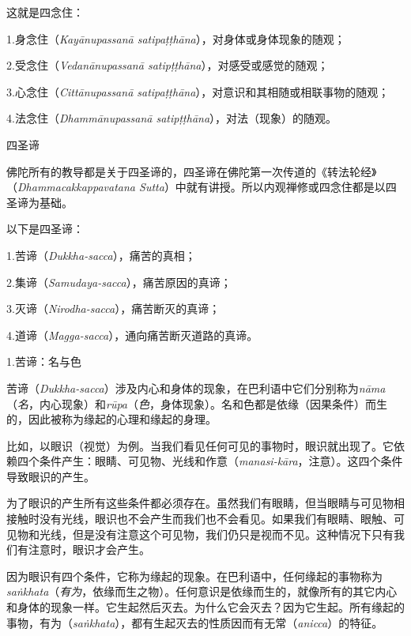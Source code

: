 这就是四念住：

{
\leftskip=1.6pc
\item{1.}身念住（{\it Kay\=anupassan\=a satipa\d t\d th\=ana}），对身体或身体现象的随观；
\item{2.}受念住（{\it Vedan\=anupassan\=a satip\d t\d th\=ana}），对感受或感觉的随观；
\item{3.}心念住（{\it Citt\=anupassan\=a satipa\d t\d th\=ana}），对意识和其相随或相联事物的随观；
\item{4.}\1法念住（{\it Dhamm\=anupassan\=a satip\d t\d th\=ana}），对法（现象）的随观。

}

\ssubsectnon 四圣谛

佛陀所有的教导都是关于四圣谛的，四圣谛在佛陀第一次传道的《转法轮经》（{\it Dhammacakkappavatana Sutta}）中就有讲授。所以内观禅修或四念住都是以四圣谛为基础。

以下是四圣谛：

{
\leftskip=1.6pc
\item{1.}苦谛（{\it Dukkha-sacca}），痛苦的真相；
\item{2.}集谛（{\it Samudaya-sacca}），痛苦原因的真谛；
\item{3.}灭谛（{\it Nirodha-sacca}），痛苦断灭的真谛；
\item{4.}道谛（{\it Magga-sacca}），通向痛苦断灭道路的真谛。

}

\sssubsectnon 1.苦谛：名与色

苦谛（{\it Dukkha-sacca}）涉及内心和身体的现象，在巴利语中它们分别称为{\it n\=ama}（{\it 名}，内心现象）和{\it r\=upa}（{\it 色}，身体现象）。名和色都是依缘（因果条件）而生的，因此被称为缘起的心理和缘起的身理。

比如，以眼识（视觉）为例。当我们看见任何可见的事物时，眼识就出现了。它依赖四个条件产生：眼睛、可见物、光线和作意（{\it manasi-k\=ara}，注意）。这四个条件导致眼识的产生。

\1为了眼识的产生所有这些条件都必须存在。虽然我们有眼睛，但当眼睛与可见物相接触时没有光线，眼识也不会产生而我们也不会看见。如果我们有眼睛、眼触、可见物和光线，但是没有注意这个可见物，我们仍只是视而不见。这种情况下只有我们有注意时，眼识才会产生。

因为眼识有四个条件，它称为缘起的现象。在巴利语中，任何缘起的事物称为{\it sa\.nkhata}（{\it 有为}，依缘而生之物）。任何意识是依缘而生的，就像所有的其它内心和身体的现象一样。它生起然后灭去。为什么它会灭去？因为它生起。所有缘起的事物，有为（{\it sa\.nkhata}），都有生起灭去的性质因而有无常（{\it anicca}）的特征。


